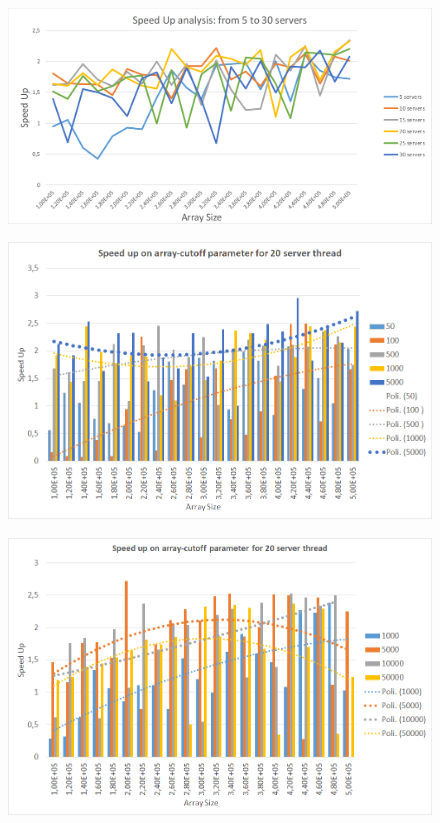 \documentclass[twocolumn]{article}
\begin{document}
\begin{figure}[h!]
	\centering
	\includegraphics[width=1.0\linewidth]{imgs/SpeedUp5-30servers}
	\caption{}
	\label{fig:speedup5-30servers}
\end{figure}

\begin{figure}[h]
	\centering
	\includegraphics[width=1.0\linewidth]{imgs/SpeedUp20ServerArrayAndCutOffAnalysis}
	\caption{}
	\label{fig:speedup20serverarrayandcutoffanalysis}
\end{figure}
\begin{figure}[h!]
	\centering
	\includegraphics[width=1.0\linewidth]{imgs/SpeedUp20ServerHigherCutoffValuesAnalysis}
	\caption{}
	\label{fig:speedup20serverhighercutoffvaluesanalysis}
\end{figure}
\end{document}
